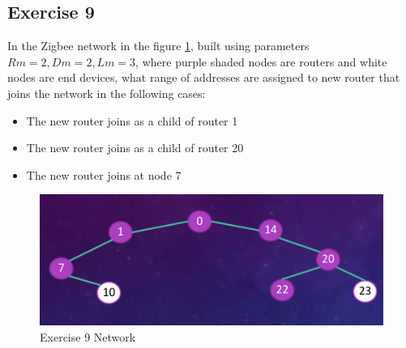 \subsection{Exercise 9}
In the Zigbee network in the figure \ref{e8-network}, built using
parameters $Rm=2, Dm=2, Lm=3$, where purple
shaded nodes are routers and white nodes are end
devices, what range of addresses are assigned to
new router that joins the network in the following
cases:

\begin{itemize}
	\item  The new router joins as a child of router 1
	\item The new router joins as a child of router 20
	\item  The new router joins at node 7
\end{itemize}

\begin{figure}[h]
	\centering\includegraphics[scale=0.50]{images/Pasted image 20230601100433.png}
	\caption{Exercise 9 Network}
	\label{e8-network}
\end{figure}







